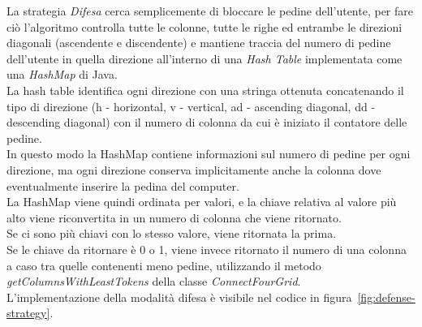 La strategia \textit{Difesa} cerca semplicemente di bloccare le pedine dell'utente, per fare ciò l'algoritmo controlla
tutte le colonne, tutte le righe ed entrambe le direzioni diagonali (ascendente e discendente) e mantiene traccia
del numero di pedine dell'utente in quella direzione all'interno di una \textit{Hash Table} implementata come
una \textit{HashMap} di Java. \\
La hash table identifica ogni direzione con una stringa ottenuta concatenando il tipo di direzione (h - horizontal,
v - vertical, ad - ascending diagonal, dd - descending diagonal) con il numero di colonna da cui è iniziato il contatore
delle pedine. \\
In questo modo la HashMap contiene informazioni sul numero di pedine per ogni direzione, ma ogni direzione conserva
implicitamente anche la colonna dove eventualmente inserire la pedina del computer. \\
La HashMap viene quindi ordinata per valori, e la chiave relativa al valore più alto viene riconvertita in un numero
di colonna che viene ritornato. \\
Se ci sono più chiavi con lo stesso valore, viene ritornata la prima. \\
Se le chiave da ritornare è 0 o 1, viene invece ritornato il numero di una colonna a caso tra quelle contenenti
meno pedine, utilizzando il metodo \textit{getColumnsWithLeastTokens} della classe \textit{ConnectFourGrid}. \\
L'implementazione della modalità difesa è visibile nel codice in figura~\ref{fig:defense-strategy}.

